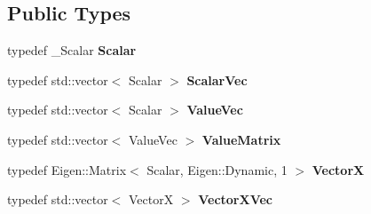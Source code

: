 \subsection*{Public Types}
\begin{DoxyCompactItemize}
\item 
typedef \+\_\+\+Scalar {\bfseries Scalar}\hypertarget{classow__core_1_1Polynomial_afbce6d192b1b52c2fc7b73bfc4157be3}{}\label{classow__core_1_1Polynomial_afbce6d192b1b52c2fc7b73bfc4157be3}

\item 
typedef std\+::vector$<$ Scalar $>$ {\bfseries Scalar\+Vec}\hypertarget{classow__core_1_1Polynomial_aba459c245cf9a39de99e96fb49aca99e}{}\label{classow__core_1_1Polynomial_aba459c245cf9a39de99e96fb49aca99e}

\item 
typedef std\+::vector$<$ Scalar $>$ {\bfseries Value\+Vec}\hypertarget{classow__core_1_1Polynomial_a38590cd8dfe762411d5a318927de5ded}{}\label{classow__core_1_1Polynomial_a38590cd8dfe762411d5a318927de5ded}

\item 
typedef std\+::vector$<$ Value\+Vec $>$ {\bfseries Value\+Matrix}\hypertarget{classow__core_1_1Polynomial_a13486a689fa201dd5a28c5815fc3f3fe}{}\label{classow__core_1_1Polynomial_a13486a689fa201dd5a28c5815fc3f3fe}

\item 
typedef Eigen\+::\+Matrix$<$ Scalar, Eigen\+::\+Dynamic, 1 $>$ {\bfseries VectorX}\hypertarget{classow__core_1_1Polynomial_a6878126756dfa05875b804d30960c583}{}\label{classow__core_1_1Polynomial_a6878126756dfa05875b804d30960c583}

\item 
typedef std\+::vector$<$ VectorX $>$ {\bfseries Vector\+X\+Vec}\hypertarget{classow__core_1_1Polynomial_afe982c78a209ed64f9462629e6fb4b21}{}\label{classow__core_1_1Polynomial_afe982c78a209ed64f9462629e6fb4b21}

\end{DoxyCompactItemize}
